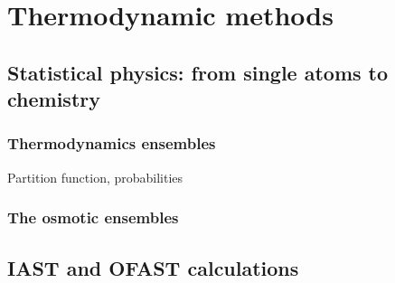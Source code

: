 \documentclass[thesis]{subfiles}
\begin{document}
\chapter{Thermodynamic methods}

\section{Statistical physics: from single atoms to chemistry}

\subsection{Thermodynamics ensembles}

Partition function, probabilities

\subsection{The osmotic ensembles}

\section{IAST and OFAST calculations}
\end{document}
